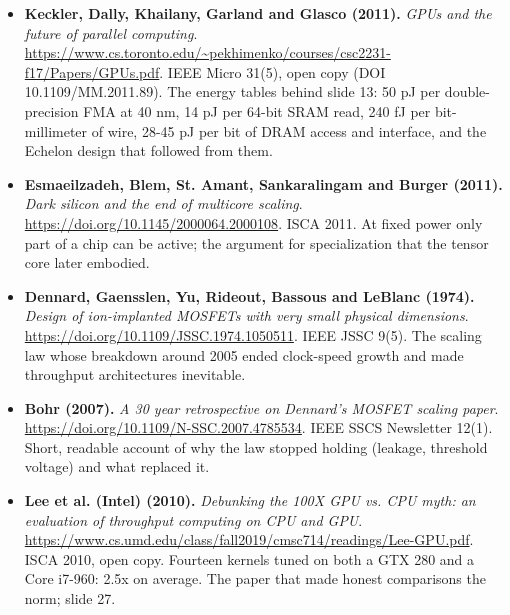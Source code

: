 \documentclass[11pt,letterpaper]{article}
\begin{document}
\begin{itemize}[leftmargin=1.2em,itemsep=3pt]
\item \textbf{Keckler, Dally, Khailany, Garland and Glasco (2011).} \textit{GPUs and the future of parallel computing}. \url{https://www.cs.toronto.edu/~pekhimenko/courses/csc2231-f17/Papers/GPUs.pdf}. IEEE Micro 31(5), open copy (DOI 10.1109/MM.2011.89). The energy tables behind slide 13: 50 pJ per double-precision FMA at 40 nm, 14 pJ per 64-bit SRAM read, 240 fJ per bit-millimeter of wire, 28-45 pJ per bit of DRAM access and interface, and the Echelon design that followed from them.
\item \textbf{Esmaeilzadeh, Blem, St. Amant, Sankaralingam and Burger (2011).} \textit{Dark silicon and the end of multicore scaling}. \url{https://doi.org/10.1145/2000064.2000108}. ISCA 2011. At fixed power only part of a chip can be active; the argument for specialization that the tensor core later embodied.
\item \textbf{Dennard, Gaensslen, Yu, Rideout, Bassous and LeBlanc (1974).} \textit{Design of ion-implanted MOSFETs with very small physical dimensions}. \url{https://doi.org/10.1109/JSSC.1974.1050511}. IEEE JSSC 9(5). The scaling law whose breakdown around 2005 ended clock-speed growth and made throughput architectures inevitable.
\item \textbf{Bohr (2007).} \textit{A 30 year retrospective on Dennard's MOSFET scaling paper}. \url{https://doi.org/10.1109/N-SSC.2007.4785534}. IEEE SSCS Newsletter 12(1). Short, readable account of why the law stopped holding (leakage, threshold voltage) and what replaced it.
\item \textbf{Lee et al. (Intel) (2010).} \textit{Debunking the 100X GPU vs. CPU myth: an evaluation of throughput computing on CPU and GPU}. \url{https://www.cs.umd.edu/class/fall2019/cmsc714/readings/Lee-GPU.pdf}. ISCA 2010, open copy. Fourteen kernels tuned on both a GTX 280 and a Core i7-960: 2.5x on average. The paper that made honest comparisons the norm; slide 27.
\end{itemize}
\end{document}
